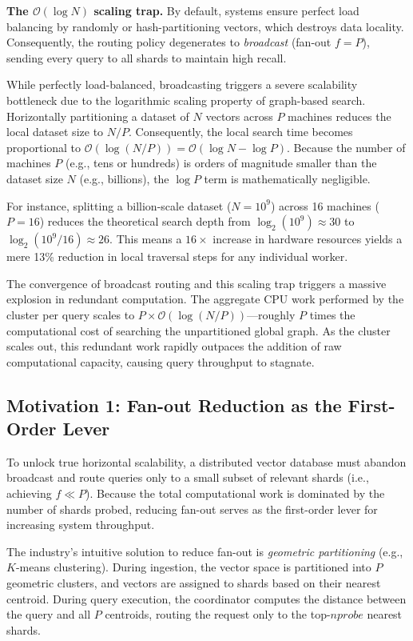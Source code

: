 \noindent\textbf{The $\mathcal{O}(\log N)$ scaling trap.} By default, systems ensure perfect load balancing by randomly or hash-partitioning vectors, which destroys data locality. Consequently, the routing policy degenerates to \textit{broadcast} (fan-out $f = P$), sending every query to all shards to maintain high recall.

While perfectly load-balanced, broadcasting triggers a severe scalability bottleneck due to the logarithmic scaling property of graph-based search. Horizontally partitioning a dataset of $N$ vectors across $P$ machines reduces the local dataset size to $N/P$. Consequently, the local search time becomes proportional to $\mathcal{O}(\log(N/P)) = \mathcal{O}(\log N - \log P)$. Because the number of machines $P$ (e.g., tens or hundreds) is orders of magnitude smaller than the dataset size $N$ (e.g., billions), the $\log P$ term is mathematically negligible. 

For instance, splitting a billion-scale dataset ($N = 10^9$) across 16 machines ($P = 16$) reduces the theoretical search depth from $\log_2(10^9) \approx 30$ to $\log_2(10^9/16) \approx 26$. This means a $16\times$ increase in hardware resources yields a mere 13\% reduction in local traversal steps for any individual worker.

The convergence of broadcast routing and this scaling trap triggers a massive explosion in redundant computation. The aggregate CPU work performed by the cluster per query scales to $P \times \mathcal{O}(\log(N/P))$---roughly $P$ times the computational cost of searching the unpartitioned global graph. As the cluster scales out, this redundant work rapidly outpaces the addition of raw computational capacity, causing query throughput to stagnate.

\subsection{Motivation 1: Fan-out Reduction as the First-Order Lever}
\label{subsec:motivation_fanout}

To unlock true horizontal scalability, a distributed vector database must abandon broadcast and route queries only to a small subset of relevant shards (i.e., achieving $f \ll P$). Because the total computational work is dominated by the number of shards probed, reducing fan-out serves as the first-order lever for increasing system throughput. 

The industry's intuitive solution to reduce fan-out is \textit{geometric partitioning} (e.g., $K$-means clustering). During ingestion, the vector space is partitioned into $P$ geometric clusters, and vectors are assigned to shards based on their nearest centroid. During query execution, the coordinator computes the distance between the query and all $P$ centroids, routing the request only to the top-$nprobe$ nearest shards.

